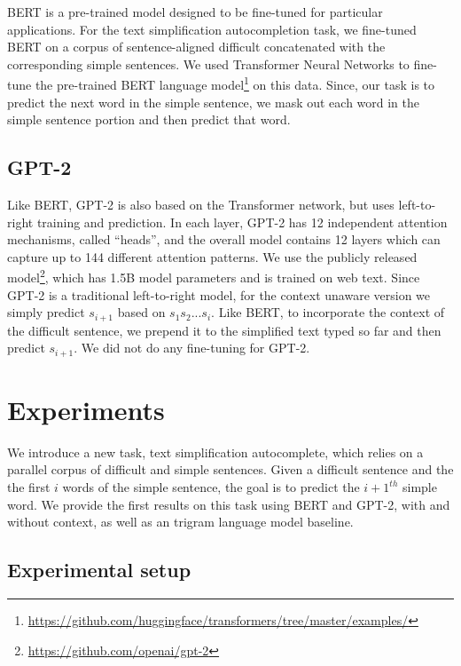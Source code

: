 \documentclass[11pt]{article}
\newcommand{\comment}[1]{\textcolor{blue}{In Progress: #1}}
\begin{document}
BERT is a pre-trained model designed to be fine-tuned for particular applications. For the text simplification autocompletion task, we fine-tuned BERT on a corpus of sentence-aligned difficult concatenated with the corresponding simple sentences. We used Transformer Neural Networks to fine-tune the pre-trained BERT language model\footnote{\url{https://github.com/huggingface/transformers/tree/master/examples/}} on this data. Since, our task is to predict the next word in the simple sentence, we mask out each word in the simple sentence portion and then predict that word.


\subsection{GPT-2} 

Like BERT, GPT-2 is also based on the Transformer network, but uses left-to-right training and prediction. In each layer, GPT-2 has 12 independent attention mechanisms, called ``heads'', and the overall model contains 12 layers which can capture up to 144 different attention patterns.  We use the publicly released model\footnote{\url{https://github.com/openai/gpt-2}}, which has 1.5B model parameters and is trained on web text.  Since GPT-2 is a traditional left-to-right model, for the context unaware version we simply predict $s_{i+1}$ based on $s_1 s_2 ... s_i$.  Like BERT, to incorporate the context of the difficult sentence, we prepend it to the simplified text typed so far and then predict $s_{i+1}$.  We did not do any fine-tuning for GPT-2.

\section{Experiments} \label{sec:results}

We introduce a new task, text simplification autocomplete, which relies on a parallel corpus of difficult and simple sentences.  Given a difficult sentence and the the first $i$ words of the simple sentence, the goal is to predict the $i+1^{th}$ simple word.  We provide the first results on this task using BERT and GPT-2, with and without context, as well as an trigram language model baseline.

\subsection{Experimental setup}
\end{document}
